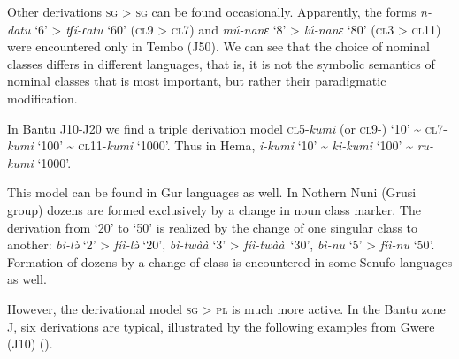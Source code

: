 Other derivations \textsc{sg} > \textsc{sg} can be found occasionally. Apparently, the forms \textit{n-datu} ‘6’ > \textit{tʃí-ɾatu} ‘60’ (\textsc{cl}9 > \textsc{cl}7) and \textit{mú-nanɛ}  ‘8’ > \textit{lú-nanɛ} ‘80’ (\textsc{cl}3 > \textsc{cl}11) were encountered only in Tembo (J50). We can see that the choice of nominal classes differs in different languages, that is, it is not the symbolic semantics of nominal classes that is most important, but rather their paradigmatic modification. 

In Bantu J10-J20 we find a triple derivation model \textsc{cl}5-\textit{kumi} (or \textsc{cl}9-) ‘10’ {\textasciitilde} \textsc{cl}7-\textit{kumi} ‘100’ {\textasciitilde} \textsc{cl}11-\textit{kumi} ‘1000’. Thus in Hema, \textit{i-kumi} ‘10’ {\textasciitilde} \textit{ki-kumi} ‘100’ {\textasciitilde} \textit{ru-kumi} ‘1000’.

This model can be found in Gur languages as well. In Nothern Nuni (Grusi group) dozens are formed exclusively by a change in noun class marker. The derivation from ‘20’ to ‘50’ is realized by the change of one singular class to another: \textit{bì-l{\`{ə}}} ‘2’ > \textit{fíì-l{\`{ə}}} ‘20’, \textit{bì-twàà} ‘3’ > \textit{fíì-twàà}~‘30’, \textit{bì-nu} ‘5’ > \textit{fíì-nu} ‘50’. Formation of dozens by a change of class is encountered in some Senufo languages as well. 

However, the derivational model \textsc{sg} > \textsc{pl} is much more active. In the Bantu zone J, six derivations are typical, illustrated by the following examples from Gwere (J10) ().


\begin{table}
\caption{\label{tab:1:23} Gwere number patterns in the derivations of numerals}

\end{table}


